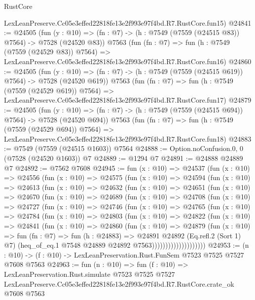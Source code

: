 \begin{lexlean}{RustCore}
\begin{coremodule}
    LexLeanPreserve.Cc05e3effed22818fe13e2f993e97f4bd.R7.RustCore.fun15)
@24841 := @24505
    (fun (y : @10) => (fn : @7) -> (h : @7549 (@7559 (@24515 @83)) @7564) -> @7528 (@24520 @83))
    @7563
    (fun (fn : @7) =>
    fun (h : @7549 (@7559 (@24529 @83)) @7564) =>
    LexLeanPreserve.Cc05e3effed22818fe13e2f993e97f4bd.R7.RustCore.fun16)
@24860 := @24505
    (fun (y : @10) => (fn : @7) -> (h : @7549 (@7559 (@24515 @619)) @7564) -> @7528 (@24520 @619))
    @7563
    (fun (fn : @7) =>
    fun (h : @7549 (@7559 (@24529 @619)) @7564) =>
    LexLeanPreserve.Cc05e3effed22818fe13e2f993e97f4bd.R7.RustCore.fun17)
@24879 := @24505
    (fun (y : @10) => (fn : @7) -> (h : @7549 (@7559 (@24515 @694)) @7564) -> @7528 (@24520 @694))
    @7563
    (fun (fn : @7) =>
    fun (h : @7549 (@7559 (@24529 @694)) @7564) =>
    LexLeanPreserve.Cc05e3effed22818fe13e2f993e97f4bd.R7.RustCore.fun18)
@24883 := @7549 (@7559 (@24515 @1603)) @7564
@24888 := Option.noConfusion.{0, 0} (@7528 (@24520 @1603)) @7
@24889 := @1294 @7
@24891 := @24888 @24889 @7
@24892 := @7562 @7608
@24945 := fun (x : @10) =>
  @24537
    (fun (x : @10) =>
    @24556
      (fun (x : @10) =>
      @24575
        (fun (x : @10) =>
        @24594
          (fun (x : @10) =>
          @24613
            (fun (x : @10) =>
            @24632
              (fun (x : @10) =>
              @24651
                (fun (x : @10) =>
                @24670
                  (fun (x : @10) =>
                  @24689
                    (fun (x : @10) =>
                    @24708
                      (fun (x : @10) =>
                      @24727
                        (fun (x : @10) =>
                        @24746
                          (fun (x : @10) =>
                          @24765
                            (fun (x : @10) =>
                            @24784
                              (fun (x : @10) =>
                              @24803
                                (fun (x : @10) =>
                                @24822
                                  (fun (x : @10) =>
                                  @24841
                                    (fun (x : @10) =>
                                    @24860
                                      (fun (x : @10) =>
                                      @24879
                                        (fun (x : @10) =>
                                        fun (fn : @7) =>
                                        fun (h : @24883) =>
                                        @24891
                                          @24892
                                          (Eq.refl.{2} (Sort 1) @7)
                                          (heq_of_eq.{1}
                                            @7548
                                            @24889
                                            @24892
                                            @7563))))))))))))))))))))
@24953 := (n : @10) -> (f : @10) -> LexLeanPreservation.Rust.FunSem @7523 @7525 @7527 @7608 @7563
@24963 := fun (n : @10) =>
  fun (f : @10) =>
  LexLeanPreservation.Rust.simulate
    @7523
    @7525
    @7527
    LexLeanPreserve.Cc05e3effed22818fe13e2f993e97f4bd.R7.RustCore.crate_ok
    @7608
    @7563
\end{coremodule}
\end{lexlean}
